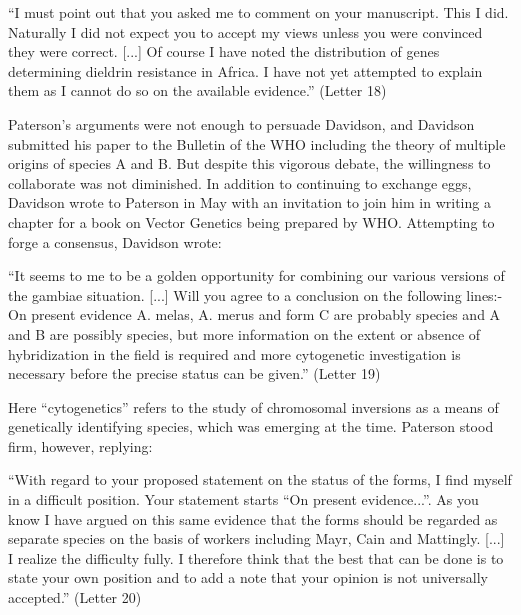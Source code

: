 \documentclass[a4paper,11pt,abstracton,hidelinks]{scrartcl}
\begin{document}
\begin{displayquote}
``I must point out that you asked me to comment on your manuscript. This I did. Naturally I did not expect you to accept my views unless you were convinced they were correct. [...] Of course I have noted the distribution of genes determining dieldrin resistance in Africa. I have not yet attempted to explain them as I cannot do so on the available evidence.'' (Letter 18)
\end{displayquote}


Paterson's arguments were not enough to persuade Davidson, and Davidson submitted his paper to the Bulletin of the WHO including the theory of multiple origins of species A and B. But despite this vigorous debate, the willingness to collaborate was not diminished. In addition to continuing to exchange eggs, Davidson wrote to Paterson in May with an invitation to join him in writing a chapter for a book on Vector Genetics being prepared by WHO. Attempting to forge a consensus, Davidson wrote:


\begin{displayquote}
``It seems to me to be a golden opportunity for combining our various versions of the gambiae situation. [...] Will you agree to a conclusion on the following lines:- On present evidence A. melas, A. merus and form C are probably species and A and B are possibly species, but more information on the extent or absence of hybridization in the field is required and more cytogenetic investigation is necessary before the precise status can be given.'' (Letter 19)
\end{displayquote}


Here ``cytogenetics'' refers to the study of chromosomal inversions as a means of genetically identifying species, which was emerging at the time. Paterson stood firm, however, replying:


\begin{displayquote}
``With regard to your proposed statement on the status of the forms, I find myself in a difficult position. Your statement starts ``On present evidence...''. As you know I have argued on this same evidence that the forms should be regarded as separate species on the basis of workers including Mayr, Cain and Mattingly. [...] I realize the difficulty fully. I therefore think that the best that can be done is to state your own position and to add a note that your opinion is not universally accepted.'' (Letter 20)
\end{displayquote}
\end{document}
